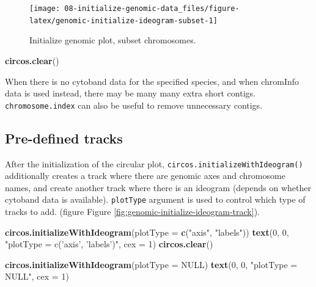 \documentclass[]{book}
\newenvironment{Shaded}{\begin{snugshade}}{\end{snugshade}}
\newcommand{\KeywordTok}[1]{\textcolor[rgb]{0.13,0.29,0.53}{\textbf{#1}}}
\newcommand{\DataTypeTok}[1]{\textcolor[rgb]{0.13,0.29,0.53}{#1}}
\newcommand{\DecValTok}[1]{\textcolor[rgb]{0.00,0.00,0.81}{#1}}
\newcommand{\StringTok}[1]{\textcolor[rgb]{0.31,0.60,0.02}{#1}}
\newcommand{\OtherTok}[1]{\textcolor[rgb]{0.56,0.35,0.01}{#1}}
\newcommand{\NormalTok}[1]{#1}
\theoremstyle{definition}
\theoremstyle{definition}
\theoremstyle{remark}
\begin{document}
\begin{figure}

{\centering \texttt{[image: 08-initialize-genomic-data\_files/figure-latex/genomic-initialize-ideogram-subset-1]} 

}

\caption{Initialize genomic plot, subset chromosomes.}\label{fig:genomic-initialize-ideogram-subset}
\end{figure}

\begin{Shaded}
\begin{Highlighting}[]
\KeywordTok{circos.clear}\NormalTok{()}
\end{Highlighting}
\end{Shaded}

When there is no cytoband data for the specified species, and when
chromInfo data is used instead, there may be many many extra short
contigs. \texttt{chromosome.index} can also be useful to remove
unnecessary contigs.

\subsection{Pre-defined tracks}\label{pre-defined-tracks}

After the initialization of the circular plot,
\texttt{circos.initializeWithIdeogram()} additionally creates a track
where there are genomic axes and chromosome names, and create another
track where there is an ideogram (depends on whether cytoband data is
available). \texttt{plotType} argument is used to control which type of
tracks to add. (figure Figure
\ref{fig:genomic-initialize-ideogram-track}).

\begin{Shaded}
\begin{Highlighting}[]
\KeywordTok{circos.initializeWithIdeogram}\NormalTok{(}\DataTypeTok{plotType =} \KeywordTok{c}\NormalTok{(}\StringTok{"axis"}\NormalTok{, }\StringTok{"labels"}\NormalTok{))}
\KeywordTok{text}\NormalTok{(}\DecValTok{0}\NormalTok{, }\DecValTok{0}\NormalTok{, }\StringTok{"plotType = c('axis', 'labels')"}\NormalTok{, }\DataTypeTok{cex =} \DecValTok{1}\NormalTok{)}
\KeywordTok{circos.clear}\NormalTok{()}

\KeywordTok{circos.initializeWithIdeogram}\NormalTok{(}\DataTypeTok{plotType =} \OtherTok{NULL}\NormalTok{)}
\KeywordTok{text}\NormalTok{(}\DecValTok{0}\NormalTok{, }\DecValTok{0}\NormalTok{, }\StringTok{"plotType = NULL"}\NormalTok{, }\DataTypeTok{cex =} \DecValTok{1}\NormalTok{)}
\end{Highlighting}
\end{Shaded}
\end{document}
